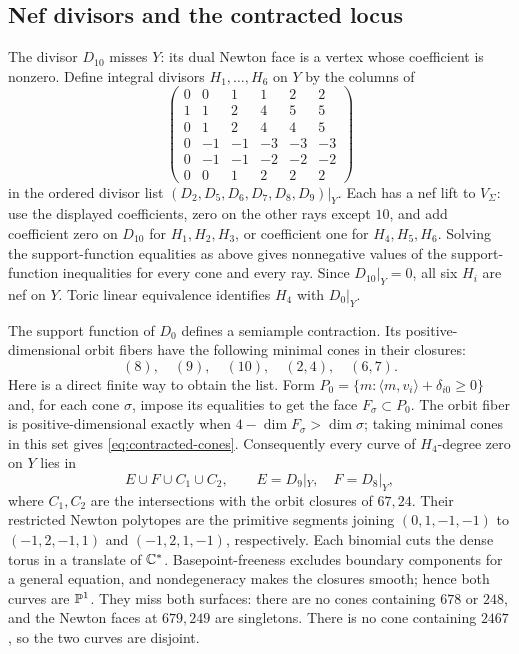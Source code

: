 \subsection{Nef divisors and the contracted locus}
The divisor $D_{10}$ misses $Y$: its dual Newton face is a vertex
whose coefficient is nonzero. Define integral divisors $H_1,\ldots,H_6$
on $Y$ by the columns of
\begin{equation}\label{eq:nef-matrix}
 \begin{pmatrix}
 0&0&1&1&2&2\\
 1&1&2&4&5&5\\
 0&1&2&4&4&5\\
 0&-1&-1&-3&-3&-3\\
 0&-1&-1&-2&-2&-2\\
 0&0&1&2&2&2
 \end{pmatrix}
\end{equation}
in the ordered divisor list $(D_2,D_5,D_6,D_7,D_8,D_9)|_Y$.
Each has a nef lift to $V_\Sigma$: use the displayed coefficients,
zero on the other rays except $10$, and add coefficient zero on
$D_{10}$ for $H_1,H_2,H_3$, or coefficient one for $H_4,H_5,H_6$.
Solving the support-function equalities as above gives nonnegative
values of the support-function inequalities for every cone and every ray.
Since $D_{10}|_Y=0$, all six
$H_i$ are nef on $Y$. Toric linear equivalence identifies $H_4$
with $D_0|_Y$.

The support function of $D_0$ defines a semiample contraction.
Its positive-dimensional orbit fibers have the following minimal
cones in their closures:
\begin{equation}\label{eq:contracted-cones}
 (8),\quad(9),\quad(10),\quad(2,4),\quad(6,7).
\end{equation}
Here is a direct finite way to obtain the list. Form
$P_0=\{m:\langle m,v_i\rangle+\delta_{i0}\ge0\}$ and, for
each cone $\sigma$, impose its equalities to get the face
$F_\sigma\subset P_0$. The orbit fiber is positive-dimensional
exactly when $4-\dim F_\sigma>\dim\sigma$; taking minimal cones
in this set gives \eqref{eq:contracted-cones}.
Consequently every curve of $H_4$-degree zero on $Y$ lies in
\begin{equation}\label{eq:contracted-locus}
 E\cup F\cup C_1\cup C_2,
 \qquad E=D_9|_Y,\quad F=D_8|_Y,
\end{equation}
where $C_1,C_2$ are the intersections with the orbit closures
of $67,24$. Their restricted Newton polytopes are the primitive
segments joining $(0,1,-1,-1)$ to $(-1,2,-1,1)$ and
$(-1,2,1,-1)$, respectively. Each binomial cuts the dense torus
in a translate of $\mathbb C^*$. Basepoint-freeness excludes boundary
components for a general equation, and nondegeneracy makes the
closures smooth; hence both curves are $\mathbb P^1$. They miss
both surfaces: there are no cones containing $678$ or $248$,
and the Newton faces at $679,249$ are singletons. There is no
cone containing $2467$, so the two curves are disjoint.

